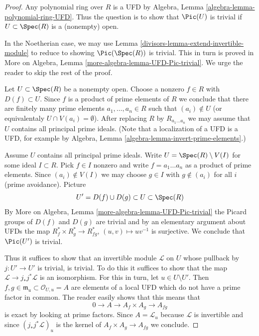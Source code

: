 \begin{proof}

Any polynomial ring over $R$ is a UFD by
Algebra, Lemma \ref{algebra-lemma-polynomial-ring-UFD}.
Thus the question is to show that $\Pic(U)$ is trivial
if $U \subset \Spec(R)$ is a (nonempty) open.

\medskip\noindent
In the Noetherian case, we may use Lemma \ref{divisors-lemma-extend-invertible-module}
to reduce to showing $\Pic(\Spec(R))$ is trivial. This in turn is
proved in More on Algebra, Lemma \ref{more-algebra-lemma-UFD-Pic-trivial}.
We urge the reader to skip the rest of the proof.

\medskip\noindent
Let $U \subset \Spec(R)$ be a nonempty open. Choose a nonzero $f \in R$
with $D(f) \subset U$. Since $f$ is a product of prime elements of $R$
we conclude that there are finitely many prime elements
$a_1, \ldots, a_n \in R$ such that $(a_i) \not \in U$ (or
equivalentaly $U \cap V(a_i) = \emptyset$).
After replacing $R$ by $R_{a_1 \ldots a_n}$ we may assume that
$U$ contains all principal prime ideals. (Note that a localization
of a UFD is a UFD, for example by Algebra, Lemma
\ref{algebra-lemma-invert-prime-elements}.)

\medskip\noindent
Assume $U$ contains all principal prime ideals.
Write $U = \Spec(R) \setminus V(I)$ for some ideal $I \subset R$.
Pick $f \in I$ nonzero and write $f = a_1 \ldots a_n$ as a product
of prime elements. Since $(a_i) \not \in V(I)$ we may choose $g \in I$ with
$g \not \in (a_i)$ for all $i$ (prime avoidance). Picture
$$
U' = D(f) \cup D(g) \subset U \subset \Spec(R)
$$
By More on Algebra, Lemma \ref{more-algebra-lemma-UFD-Pic-trivial}
the Picard groups of $D(f)$ and $D(g)$ are trivial and by an elementary
argument about UFDs the map $R_f^* \times R_g^* \to R_{fg}^*$,
$(u, v) \mapsto uv^{-1}$ is surjective. We conclude that
$\Pic(U')$ is trivial.

\medskip\noindent
Thus it suffices to show that an invertible module $\mathcal{L}$
on $U$ whose pullback by $j : U' \to U'$ is trivial, is trivial.
To do this it suffices to show that the map
$\mathcal{L} \to j_*j^*\mathcal{L}$ is an isomorphism.
For this in turn, let $u \in U \setminus U'$. Then
$f, g \in \mathfrak m_u \subset \mathcal{O}_{U, u} = A$ are elements
of a local UFD which do not have a prime factor in common. The reader
easily shows that this means that
$$
0 \to A \to A_f \times A_g \to A_{fg}
$$
is exact by looking at prime factors. Since $A = \mathcal{L}_u$
because $\mathcal{L}$ is invertible and since $(j_*j^*\mathcal{L})_u$
is the kernel of $A_f \times A_g \to A_{fg}$ we conclude.
\end{proof}

